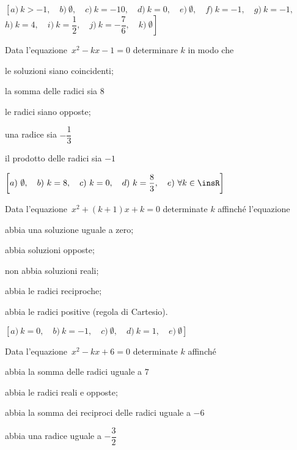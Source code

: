 \begin{flushright}
$\left[a)~k >-1,\quad b)~\emptyset,\quad c)~k =-10,\quad 
        d)~k = 0,\quad e)~ \emptyset ,\quad f)~ k =-1 ,\quad 
        g)~ k =-1 ,\quad \right.$
       $\left. h)~ k = 4 ,\quad i)~ k = \dfrac{1}{2} ,\quad 
        j)~ k =-\dfrac{7}{6} ,\quad k)~\emptyset\right]$
\end{flushright}

\begin{esercizio}[\Ast]
 \label{ese:3.98}
Data l'equazione~$x^{2}-kx -1 = 0$ determinare $k$ in modo che
\begin{enumeratea}
\item le soluzioni siano coincidenti;~
\item la somma delle radici sia $8$
\item le radici siano opposte;~
\item una radice sia $- \dfrac{1}{3}$
\item il prodotto delle radici sia $-1$
\end{enumeratea}
\end{esercizio}

\begin{flushright}
$\left[a)~\emptyset ,\quad b)~k = 8 ,\quad c)~ k = 0,\quad 
d)~k = \dfrac{8}{3} ,\quad e)~\forall k \in \insR\right]$
\end{flushright}

\begin{esercizio}[\Ast]
 \label{ese:3.99}
Data l'equazione~$x^{2} + (k + 1) x + k = 0$ determinate $k$ affinché 
l'equazione
\begin{enumeratea}
\item abbia una soluzione uguale a zero;~
\item abbia soluzioni opposte;~
\item non abbia soluzioni reali;~
\item abbia le radici reciproche;~
\item abbia le radici positive (regola di Cartesio).
\end{enumeratea}
\end{esercizio}

\begin{flushright}
$\left[a)~ k = 0 ,\quad b)~ k =-1 ,\quad c)~ \emptyset ,\quad 
d)~ k = 1 ,\quad e)~ \emptyset \right]$
\end{flushright}

\begin{esercizio}[\Ast]
 \label{ese:3.100}
Data l'equazione~$x^{2}-kx + 6 = 0$ determinate $k$ affinché
\begin{enumeratea}
\item abbia la somma delle radici uguale a $7$
\item abbia le radici reali e opposte;~
\item abbia la somma dei reciproci delle radici uguale a $-6$
\item abbia una radice uguale a $- \dfrac{3}{2}$
\end{enumeratea}
\end{esercizio}

